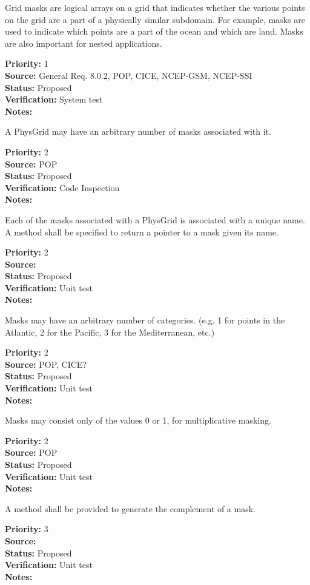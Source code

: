 Grid masks are logical arrays on a grid that indicates whether the various
points on the grid are a part of a physically similar subdomain. For example,
masks are used to indicate which points are a part of the ocean and which are
land.  Masks are also important for nested applications.

\begin{reqlist}
{\bf Priority:} 1 \\
{\bf Source:} General Req. 8.0.2, POP, CICE, NCEP-GSM, NCEP-SSI \\
{\bf Status:} Proposed \\
{\bf Verification:} System test\\
{\bf Notes:} 
\end{reqlist}

A PhysGrid may have an arbitrary number of masks associated with it.
\begin{reqlist}
{\bf Priority:} 2 \\
{\bf Source:} POP \\
{\bf Status:} Proposed \\
{\bf Verification:} Code Inspection\\
{\bf Notes:} 
\end{reqlist}

Each of the masks associated with a PhysGrid is associated with a
unique name.  A method shall be specified to return a pointer to a mask given
its name.
\begin{reqlist}
{\bf Priority:} 2 \\
{\bf Source:}  \\
{\bf Status:} Proposed \\
{\bf Verification:} Unit test\\
{\bf Notes:} 
\end{reqlist}

Masks may have an arbitrary number of categories. (e.g. 1 for points in the
Atlantic, 2 for the Pacific, 3 for the Mediterranean, etc.)
\begin{reqlist}
{\bf Priority:} 2 \\
{\bf Source:} POP, CICE? \\
{\bf Status:} Proposed \\
{\bf Verification:} Unit test\\
{\bf Notes:} 
\end{reqlist}

Masks may consist only of the values 0 or 1, for multiplicative masking.
\begin{reqlist}
{\bf Priority:} 2 \\
{\bf Source:} POP \\
{\bf Status:} Proposed \\
{\bf Verification:} Unit test\\
{\bf Notes:} 
\end{reqlist}

A method shall be provided to generate the complement of a mask.
\begin{reqlist}
{\bf Priority:} 3 \\
{\bf Source:} \\
{\bf Status:} Proposed \\
{\bf Verification:} Unit test\\
{\bf Notes:} 
\end{reqlist}
